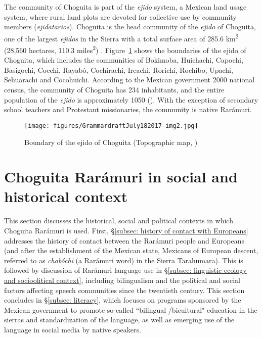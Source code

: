The community of Choguita is part of the \textit{ejido} system, a Mexican land usage system, where rural land plots are devoted for collective use by community members (\textit{ejidatarios}). Choguita is the head community of the \textit{ejido} of Choguita, one of the largest \textit{ejidos} in the Sierra with a total surface area of 285.6 km\textsuperscript{2} (28,560 hectares, 110.3 miles\textsuperscript{2}) \citep{casaus2008quantitative}. Figure~\ref{fig: boundary of the ejido of choguita} shows the boundaries of the ejido of Choguita, which includes the communities of Bokimoba, Huichachi, Capochi, Basigochi, Coechi, Rayabó, Cochirachi, Ireachi, Rorichi, Rochibo, Upachi, Sehuarachi and Cocohuichi. According to the Mexican government 2000 national census, the community of Choguita has 234 inhabitants, and the entire population of the \textit{ejido} is approximately 1050 (\citealt{casaus2008quantitative}). With the exception of secondary school teachers and Protestant missionaries, the community is native Rarámuri.








\begin{figure}
\texttt{[image: figures/GrammardraftJuly182017-img2.jpg]}
\caption{
\label{fig: boundary of the ejido of choguita}
Boundary of the ejido of Choguita (Topographic map, \citealt{casaus2008quantitative})}
\end{figure}

\section{Choguita Rarámuri in social and historical context}
\label{sec: social and historical context}

This section discusses the historical, social and political contexts in which Choguita Rarámuri is used. First, §\ref{subsec: history of contact with Europeans} addresses the history of contact between the Rarámuri people and Europeans (and after the establishment of the Mexican state, Mexicans of European descent, referred to as \textit{chabóchi} (a Rarámuri word) in the Sierra Tarahumara). This is followed by discussion of Rarámuri language use in §\ref{subsec: linguistic ecology and socioolitical context}, including bilingualism and the political and social factors affecting speech communities since the twentieth century. This section concludes in §\ref{subsec: literacy}, which focuses on programs sponsored by the Mexican government to promote so-called ``bilingual /bicultural" education in the sierras and standardization of the language, as well as emerging use of the language in social media by native speakers.

